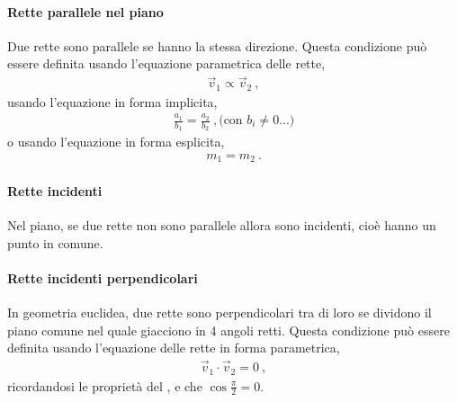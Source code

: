 \documentclass[letterpaper,10pt,italian]{jupyterBook}
\begin{document}
\paragraph{Rette parallele nel piano}
\label{\detokenize{ch/analytic_geometry/analytic_geometry_2d/lines:rette-parallele-nel-piano}}
\sphinxAtStartPar
Due rette sono parallele se hanno la stessa direzione. Questa condizione può essere definita usando l’equazione parametrica delle rette,
\begin{equation*}
\begin{split}\vec{v}_1 \propto \vec{v}_2 \ ,\end{split}
\end{equation*}
\sphinxAtStartPar
usando l’equazione in forma implicita,
\begin{equation*}
\begin{split}\frac{a_1}{b_1} = \frac{a_2}{b_2} \ , \text{(con $b_i \ne 0$...)}\end{split}
\end{equation*}
\sphinxAtStartPar
o usando l’equazione in forma esplicita,
\begin{equation*}
\begin{split}m_1 = m_2 \ .\end{split}
\end{equation*}

\paragraph{Rette incidenti}
\label{\detokenize{ch/analytic_geometry/analytic_geometry_2d/lines:rette-incidenti}}
\sphinxAtStartPar
Nel piano, se due rette non sono parallele allora sono incidenti, cioè hanno un punto in comune.


\paragraph{Rette incidenti perpendicolari}
\label{\detokenize{ch/analytic_geometry/analytic_geometry_2d/lines:rette-incidenti-perpendicolari}}
\sphinxAtStartPar
In geometria euclidea, due rette sono perpendicolari tra di loro se dividono il piano comune nel quale giacciono in 4 angoli retti. Questa condizione può essere definita usando l’equazione delle rette in forma parametrica,
\begin{equation*}
\begin{split}\vec{v}_1 \cdot \vec{v}_2 = 0 \ ,\end{split}
\end{equation*}
\sphinxAtStartPar
ricordandosi le proprietà del , e che \(\cos \frac{\pi}{2} = 0\).
\end{document}
